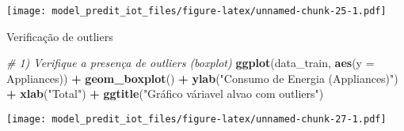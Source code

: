 \documentclass[
]{article}
\newenvironment{Shaded}{\begin{snugshade}}{\end{snugshade}}
\newcommand{\AttributeTok}[1]{\textcolor[rgb]{0.13,0.29,0.53}{#1}}
\newcommand{\CommentTok}[1]{\textcolor[rgb]{0.56,0.35,0.01}{\textit{#1}}}
\newcommand{\ConstantTok}[1]{\textcolor[rgb]{0.56,0.35,0.01}{#1}}
\newcommand{\DocumentationTok}[1]{\textcolor[rgb]{0.56,0.35,0.01}{\textbf{\textit{#1}}}}
\newcommand{\FloatTok}[1]{\textcolor[rgb]{0.00,0.00,0.81}{#1}}
\newcommand{\FunctionTok}[1]{\textcolor[rgb]{0.13,0.29,0.53}{\textbf{#1}}}
\newcommand{\NormalTok}[1]{#1}
\newcommand{\OtherTok}[1]{\textcolor[rgb]{0.56,0.35,0.01}{#1}}
\newcommand{\SpecialCharTok}[1]{\textcolor[rgb]{0.81,0.36,0.00}{\textbf{#1}}}
\newcommand{\StringTok}[1]{\textcolor[rgb]{0.31,0.60,0.02}{#1}}
\begin{document}
\texttt{[image: model\_predit\_iot\_files/figure-latex/unnamed-chunk-25-1.pdf]}

Verificação de outliers

\begin{Shaded}
\end{Shaded}

\begin{Shaded}
\begin{Highlighting}[]
\CommentTok{\# 1) Verifique a presença de outliers (boxplot)}
\FunctionTok{ggplot}\NormalTok{(data\_train, }\FunctionTok{aes}\NormalTok{(}\AttributeTok{y =}\NormalTok{ Appliances)) }\SpecialCharTok{+}
  \FunctionTok{geom\_boxplot}\NormalTok{() }\SpecialCharTok{+}
  \FunctionTok{ylab}\NormalTok{(}\StringTok{"Consumo de Energia (Appliances)"}\NormalTok{) }\SpecialCharTok{+}
  \FunctionTok{xlab}\NormalTok{(}\StringTok{"Total"}\NormalTok{) }\SpecialCharTok{+}
  \FunctionTok{ggtitle}\NormalTok{(}\StringTok{"Gráfico váriavel alvao com outliers"}\NormalTok{)}
\end{Highlighting}
\end{Shaded}

\texttt{[image: model\_predit\_iot\_files/figure-latex/unnamed-chunk-27-1.pdf]}

\begin{Shaded}
\end{Shaded}
\end{document}
